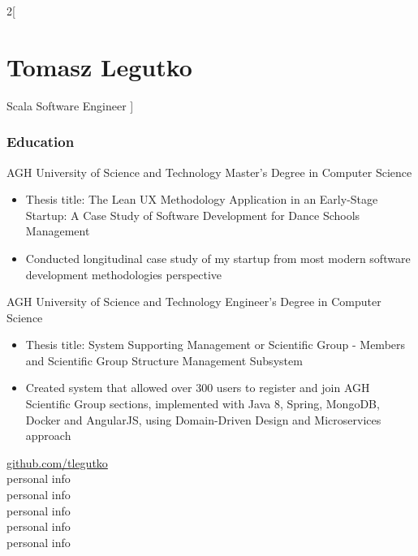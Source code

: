 \documentclass{tccv}
\begin{document}
\begin{multicols}{2}[
\part{Tomasz Legutko}{Scala Software Engineer}
]
\begin{eventlist}
\end{eventlist}

\bigskip
\section{Education}
\begin{eventlist}

     {AGH University of Science and Technology}
     {Master's Degree in Computer Science}
     \begin{itemize}[noitemsep,topsep=0pt]
     \item Thesis title: The Lean UX Methodology Application in an Early-Stage Startup: A Case Study of Software Development for Dance Schools Management
     \item Conducted longitudinal case study of my startup from most modern software development methodologies perspective %
     \end{itemize}

     {AGH University of Science and Technology}
     {Engineer's Degree in Computer Science}
     \begin{itemize}[noitemsep,topsep=0pt]
     \item Thesis title: System Supporting Management or Scientific Group - Members and Scientific Group Structure Management Subsystem
     \item Created system that allowed over 300 users to register and join AGH Scientific Group sections, implemented with Java 8, Spring, MongoDB, Docker and AngularJS, using Domain-Driven Design and Microservices approach
     \end{itemize}

\end{eventlist}

\vfill\null
\columnbreak

\hspace*{0.7pt}\faGithub\hspace{1pt} \href{https://github.com/tlegutko}{github.com/tlegutko}\\
\faEnvelope\hspace{0.5pt} personal info\\
\hspace*{1.4pt}\faPhone\hspace{1.2pt} personal info\\ 
\hspace*{2.5pt}\faMapMarker\hspace{2pt} personal info\\
\hspace*{2.6pt}\phantom\faMapMarker \hspace{2pt} personal info\\
\faBirthdayCake\hspace{0.7pt} personal info\\


\end{multicols}
\end{document}
